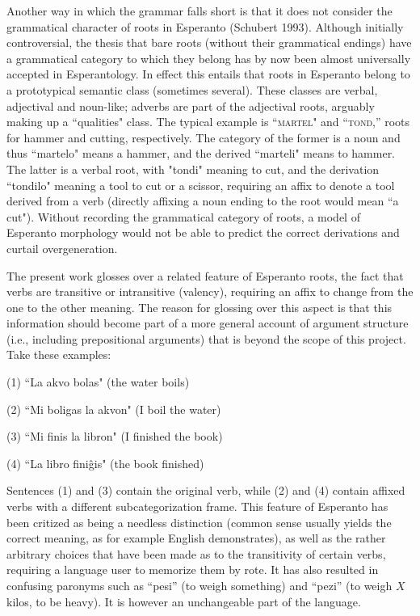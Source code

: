 \documentclass[10pt,a4paper]{article}
\begin{document}
Another way in which the grammar falls short is that it does not consider the
grammatical character of roots in Esperanto (Schubert 1993). Although initially
controversial, the thesis that bare roots (without their grammatical endings)
have a  grammatical category to which they belong has by now been almost
universally accepted in Esperantology. In effect this entails that roots in
Esperanto belong to a prototypical semantic class (sometimes several).  These
classes are verbal, adjectival and noun-like; adverbs are part of the
adjectival roots, arguably making up a ``qualities" class. The
typical example is ``\textsc{martel}" and ``\textsc{tond},'' roots for hammer and cutting,
respectively. The category of the former is a noun and thus ``martelo" means a
hammer, and the derived ``marteli" means to hammer. The latter is a verbal root, 
with "tondi" meaning to cut, and the derivation ``tondilo" meaning a
tool to cut or a scissor, requiring an affix to denote a tool derived from a
verb (directly affixing a noun ending to the root would mean ``a cut"). Without
recording the grammatical category of roots, a model of Esperanto morphology
would not be able to predict the correct derivations and curtail overgeneration.

The present work glosses over a related feature of Esperanto roots, the fact
that verbs are transitive or intransitive (valency), requiring an affix to
change from the one to the other meaning. The reason for glossing over this
aspect is that this information should become part of a more general account of
argument structure (i.e., including prepositional arguments) that is beyond the
scope of this project. Take these examples:

(1) ``La akvo bolas" (the water boils)

(2) ``Mi boligas la akvon" (I boil the water)

(3) ``Mi finis la libron" (I finished the book)

(4) ``La libro fini\^gis" (the book finished)

Sentences (1) and (3) contain the original verb, while (2) and (4) contain
affixed verbs with a different subcategorization frame. This feature of
Esperanto has been critized as being a needless distinction (common sense
usually yields the correct meaning, as for example English demonstrates),
as well as the rather arbitrary choices that have been made as to the
transitivity of certain verbs, requiring a language user to memorize them by
rote. It has also resulted in confusing paronyms such as ``pesi'' (to weigh
something) and ``pezi'' (to weigh $X$ kilos, to be heavy). It is however an
unchangeable part of the language.
\end{document}
